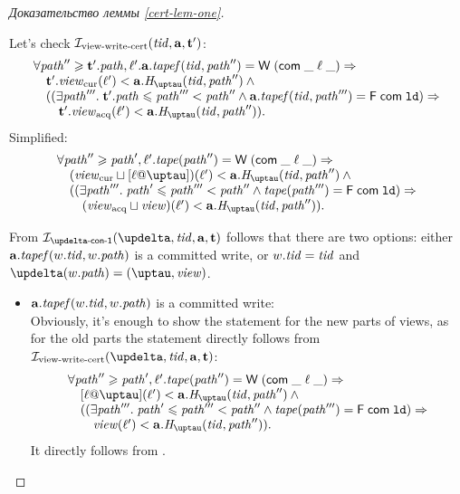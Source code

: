 \begin{proof}[Доказательство леммы \ref{cert-lem-one}]
\begin{itemize}
      Let's check $\mathcal{I}_{\textup{\rm view-write-cert}}(\mathit{tid}, \mathbf{a}, \mathbf{t}')$:
      \[\begin{array}{l}
        \forall \cpath'' \ge \tT'.\cpath, \loc'. \aT.\tapef(\tId, \cpath'') = \tapeWrite{(\tapeWriteCommitted{\_}{\loc}{\_})} \Rightarrow \\
        \quad \tT'.\Rcur(\loc') < \aT.\tmap(\tId, \cpath'') \land {} \\
        \quad ((\exists \cpath'''. \; \tT'.\cpath \le \cpath''' < \cpath'' \land 
             \aT.\tapef(\tId, \cpath''') = \tapeFence{\Committed}{\LD}) \Rightarrow \\
        \quad \quad \tT'.\Racq(\loc') < \aT.\tmap(\tId, \cpath'')).\\
      \end{array}\]
      Simplified:
      \[\begin{array}{l}
        \forall \cpath'' \ge \cpath', \loc'. \tape(\cpath'') = \tapeWrite{(\tapeWriteCommitted{\_}{\loc}{\_})} \Rightarrow \\
        \quad (\Rcur \sqcup [\loc @ \tau])(\loc') < \aT.\tmap(\tId, \cpath'') \land {} \\
        \quad ((\exists \cpath'''. \; \cpath' \le \cpath''' < \cpath'' \land 
             \tape(\cpath''') = \tapeFence{\Committed}{\LD}) \Rightarrow \\
        \quad \quad (\Racq \sqcup \R)(\loc') < \aT.\tmap(\tId, \cpath'')).\\
      \end{array}\]
      
      From $\invDeltaDefOne(\delta, \tId, \aT, \tT)$ follows that there are two options:
      either $\mathbf{a}.\mathit{tapef}(w.\mathit{tid}, w.\mathit{path})$ is a committed write, or $w.\mathit{tid} = \mathit{tid}$ and $\delta(\w.\cpath) = (\tau, \R)$.
      
      \begin{itemize}
        \item $\mathbf{a}.\mathit{tapef}(w.\mathit{tid}, w.\mathit{path})$ is a committed write: \\
      Obviously, it's enough to show the statement for the new parts of views, as for the old parts the statement directly
      follows from $\invViewWriteCERT(\delta, \tId, \aT, \tT)$:
      \[\begin{array}{l}
        \forall \cpath'' \ge \cpath', \loc'. \tape(\cpath'') = \tapeWrite{(\tapeWriteCommitted{\_}{\loc}{\_})} \Rightarrow \\
        \quad [\loc @ \tau](\loc') < \aT.\tmap(\tId, \cpath'') \land {} \\
        \quad ((\exists \cpath'''. \; \cpath' \le \cpath''' < \cpath'' \land 
             \tape(\cpath''') = \tapeFence{\Committed}{\LD}) \Rightarrow \\
        \quad \quad \R(\loc') < \aT.\tmap(\tId, \cpath'')).\\
      \end{array}\]
      It directly follows from \app{\ref{thm:invAview}}.


\end{itemize}
\end{itemize}
\end{proof}
